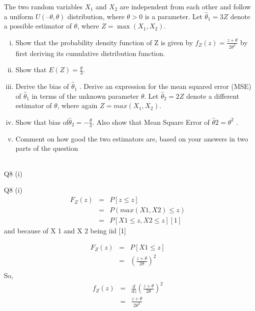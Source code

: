 \documentclass[a4paper,12pt]{article}
\begin{document}
\large
The two random variables $X_1$ and $X_2$ are independent from each other and follow a
uniform $U(– \theta, \theta)$ distribution, where $\theta > 0$ is a parameter.
Let $\hat{\theta}_1 = 3Z$ denote a possible estimator of $\theta$, where $Z = \operatorname{max}(X_1,X_2)$.


\begin{enumerate}[(i)]
\item Show that the probability density function of Z is given by 
${ \displaystyle f_Z(z) = \frac{z+ \theta}{2\theta^2} }$
by first deriving its cumulative distribution function.
\item Show that ${ \displaystyle E ( Z ) = \frac{\theta}{3} }$. 
\item 
Derive the bias of $\hat{\theta}_1$ .
Derive an expression for the mean squared error (MSE) of $\hat{\theta}_1$ in terms
of the unknown parameter $\theta$.
\medskip
Let $\hat{\theta}_2 = 2 Z$ denote a different estimator of $\theta$, where again $Z = max(X_1 , X_2 )$.
\smallskip
\item Show that bias of$\hat{\theta}_2 = − \frac{\theta}{3}$. Also show that Mean Square Error of $\hat{\theta} 2 = \theta^2$ . 
\item 
Comment on how good the two estimators are, based on your answers in two parts of the question
\end{enumerate}


\newpage

\begin{table}[ht!]
 \centering
 \begin{tabular}{|p{15cm}|}
 \hline  
 
 \\ \hline
  \end{tabular}
\end{table}



Q8
(i)

Q8
(i)
\begin{eqnarray*}
F_{Z} ( z )  &=&  P \left[  z \leq  z \right]  \\ 
&=&  P ( max ( X 1 , X 2 ) \leq  z )  \\ 
&=&   P \left[  X 1 \leq  z , X 2 \leq  z \right] [1]
\end{eqnarray*}
and because of X 1 and X 2 being iid [1]

\begin{eqnarray*}
F_{Z} ( z )  &=&  P \left[  X 1 \leq  z \right]\\
 &=& \left(  \frac{z +  \theta}{2\theta} \right)^2\\
\end{eqnarray*}
So, 
\begin{eqnarray*}f_{Z} ( z )  &=&  \frac{d}{dz} \left(  \frac{z +  \theta}{2\theta} \right)^2 \\
&=& \frac{z +  \theta}{2\theta^2}\\
\end{eqnarray*}
\end{document}
